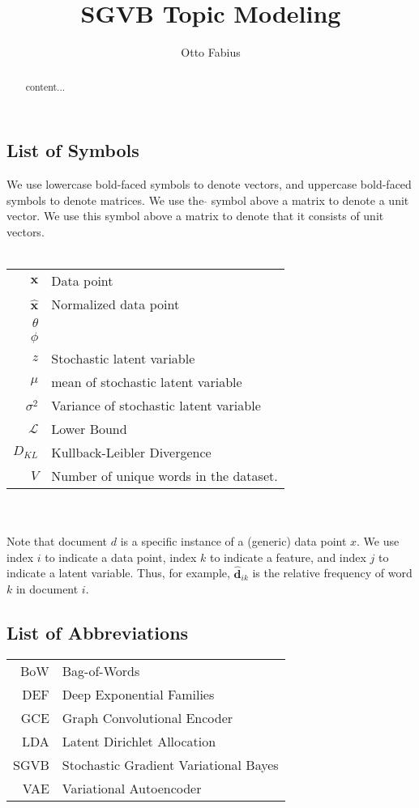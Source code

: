 \documentclass{report}
\author{Otto Fabius}
\title{SGVB Topic Modeling}
\begin{document}
\large
\doublespacing
\maketitle
\begin{abstract}
	content...
\end{abstract}
\chapter*{}
\onehalfspacing
\section*{List of Symbols}
We use lowercase bold-faced symbols to denote vectors, and uppercase bold-faced symbols to denote matrices. We use the $\hat{}$ symbol above a matrix to denote a unit vector. We use this symbol above a matrix to denote that it consists of unit vectors. \\ \\
\begin{tabular}{r l}
	\hspace{15mm} $\mathbf{x}$ & Data point \\
	$\mathbf{\hat{x}}$ & Normalized data point \\
	$\theta$ & \\
	$\phi$ & \\
	$z$ & Stochastic latent variable\\
	$\mu$ & mean of stochastic latent variable\\
	$\sigma ^2 $ & Variance of stochastic latent variable \\
	$\mathcal{L}$ & Lower Bound \\
	$D_{KL}$ & Kullback-Leibler Divergence \\
	$V$ & Number of unique words in the dataset.
\end{tabular}
\\ \\
Note that document $d$ is a specific instance of a (generic) data point $x$. We use index $i$ to indicate a data point, index $k$ to indicate a feature, and index $j$ to indicate a latent variable.  Thus, for example, $\mathbf{\hat{d}}_{ik}$ is the relative frequency of word $k$ in document $i$.
\section*{List of Abbreviations}
\begin{tabular}{r l}
	\hspace{10mm} BoW & Bag-of-Words \\
	DEF & Deep Exponential Families \\
	GCE & Graph Convolutional Encoder \\
	LDA & Latent Dirichlet Allocation \\
	SGVB & Stochastic Gradient Variational Bayes \\
	VAE & Variational Autoencoder \\
\end{tabular}
\end{document}

